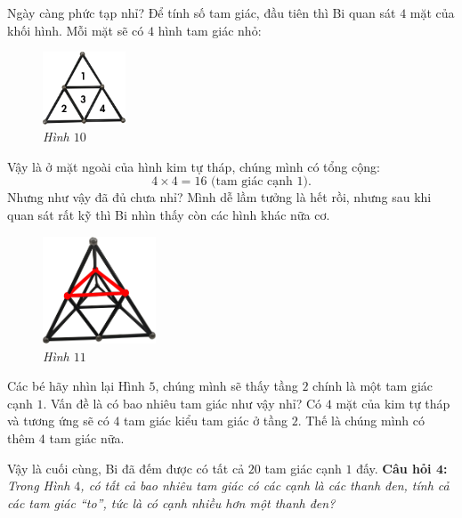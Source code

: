 	\begin{multicols}{2}
		Ngày càng phức tạp nhỉ? Để tính số tam giác, đầu tiên thì Bi quan sát $4$ mặt của khối hình. Mỗi mặt sẽ có $4$ hình tam giác nhỏ:
		\begin{figure}[H]
			\centering
			\vspace*{-10pt}
			\captionsetup{labelformat= empty, justification=centering} \includegraphics[width=0.22\textwidth]{10}
			\caption{\small\textit{Hình $10$}}
			\vspace*{-10pt}
		\end{figure}
	\end{multicols}
	Vậy là ở mặt ngoài của hình kim tự tháp, chúng mình có tổng cộng:
	$$4 \times 4 = 16 \text{ (tam giác cạnh $1$)}.$$
	Nhưng như vậy đã đủ chưa nhỉ? Mình dễ lầm tưởng là hết rồi, nhưng sau khi quan sát rất kỹ thì Bi nhìn thấy còn các hình khác nữa cơ.
	\begin{multicols}{2}
		\begin{figure}[H]
			\centering
			\vspace*{5pt}
			\captionsetup{labelformat= empty, justification=centering} \includegraphics[width=0.3\textwidth]{11}
			\caption{\small\textit{Hình $11$}}
			\vspace*{-10pt}
		\end{figure}
		Các bé hãy nhìn lại Hình $5$, chúng mình sẽ thấy tầng $2$ chính là một tam giác cạnh $1$. Vấn đề là có bao nhiêu tam giác như vậy nhỉ? Có $4$ mặt của kim tự tháp và tương ứng sẽ có $4$ tam giác kiểu tam giác ở tầng $2$. Thế là chúng mình có thêm $4$ tam giác nữa.
	\end{multicols}
	\vskip 0.1cm
	Vậy là cuối cùng, Bi đã đếm được có tất cả $20$ tam giác cạnh $1$ đấy.
	\vskip 0.1cm
	\textbf{Câu hỏi $\pmb{4}$:} \textit{Trong Hình $4$, có tất cả bao nhiêu tam giác có các cạnh là các thanh đen, tính cả các tam giác “to”, tức là có cạnh nhiều hơn một thanh đen?}

